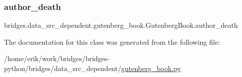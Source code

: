 \subsubsection{\texorpdfstring{author\+\_\+death}{author\_death}}
{\footnotesize\ttfamily bridges.\+data\+\_\+src\+\_\+dependent.\+gutenberg\+\_\+book.\+Gutenberg\+Book.\+author\+\_\+death}



The documentation for this class was generated from the following file\+:\begin{DoxyCompactItemize}
\item 
/home/erik/work/bridges/bridges-\/python/bridges/data\+\_\+src\+\_\+dependent/\hyperlink{gutenberg__book_8py}{gutenberg\+\_\+book.\+py}\end{DoxyCompactItemize}
